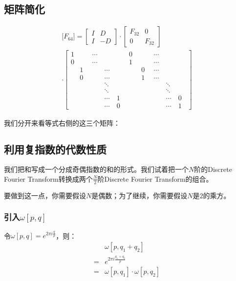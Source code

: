 \subsection{矩阵简化}
\begin{align*}
	\Bigg[F_{64}\Bigg]=\begin{bmatrix}
		I & D \\I&-D
	\end{bmatrix}
	\cdot
	\begin{bmatrix}F_{32}&0\\0&F_{32}\end{bmatrix} \\
	\cdot
	\begin{bmatrix}
		1 & \quad & \cdots & \quad  & \quad & 0     & \quad & \cdots & \quad  & \quad \\
		0 & \quad & \cdots & \quad  & \quad & 1     & \quad & \cdots & \quad  & \quad \\
		  & 1     & \quad  & \cdots & \quad & \quad & 0     & \cdots & \quad  & \quad \\
		  & 0     & \quad  & \cdots & \quad & \quad & 1     & \cdots & \quad  & \quad \\
		  & \quad & \quad  & \ddots & \quad & \quad & \quad & \quad  & \ddots & \quad \\
		  & \quad & \quad  & \ddots & \quad & \quad & \quad & \quad  & \ddots & \quad \\
		  & \quad & \quad  & \cdots & 1     & \quad & \quad & \quad  & \cdots & 0     \\
		  & \quad & \quad  & \cdots & 0     & \quad & \quad & \quad  & \cdots & 1
	\end{bmatrix}
\end{align*}

我们分开来看等式右侧的这三个矩阵：

\subsection{利用复指数的代数性质}
我们把和写成一个分成奇偶指数的和的形式。我们试着把一个$N$阶的Discrete Fourier Transform转换成两个$\frac{N}{2}$阶Discrete Fourier Transform的组合。

要做到这一点，你需要假设$N$是偶数；为了继续，你需要假设$N$是$2$的乘方。
\subsubsection{引入$\omega[p,q]$}
令$\omega[p,q] = e^{2\pi i\frac{q}{p}}$，则：
\begin{align*}
	  & \omega[p,q_1+q_2]                \\
	= & e^{2\pi i\frac{q_1+q_2}{p}}      \\
	= & \omega[p,q_1]\cdot \omega[p,q_2]
\end{align*}

